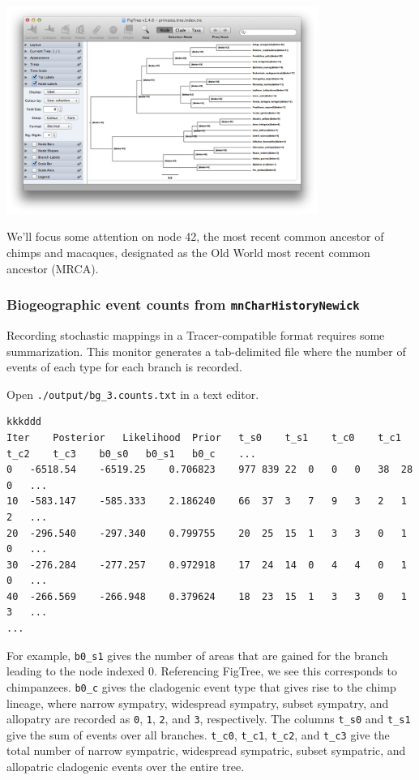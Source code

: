 \begin{centering}
\includegraphics[width=4in]{figures/figtree_node_label}
\end{centering}

We'll focus some attention on node 42, the most recent common ancestor of chimps and macaques, designated as the Old World most recent common ancestor (MRCA).

\subsubsection{Biogeographic event counts from {\tt mnCharHistoryNewick}}

Recording stochastic mappings in a Tracer-compatible format requires some summarization.
This monitor generates a tab-delimited file where the number of events of each type for each branch is recorded.

Open {\tt ./output/bg\_3.counts.txt} in a text editor.

\begin{framed}
\begin{lstlisting}[style=textboxSmall]  % \listingsfont, columns=texcl]
kkkddd
Iter	Posterior	Likelihood	Prior	t_s0	t_s1	t_c0	t_c1	t_c2	t_c3	b0_s0	b0_s1	b0_c	...
0	-6518.54	-6519.25	0.706823	977	839	22	0	0	0	38	28	0	...
10	-583.147	-585.333	2.186240	66	37	3	7	9	3	2	1	2	...
20	-296.540	-297.340	0.799755	20	25	15	1	3	3	0	1	0	...
30	-276.284	-277.257	0.972918	17	24	14	0	4	4	0	1	0	...
40	-266.569	-266.948	0.379624	18	23	15	1	3	3	0	1	3	...
...
\end{lstlisting}
\end{framed}

For example, {\tt b0\_s1} gives the number of areas that are gained for the branch leading to the node indexed 0.
Referencing FigTree, we see this corresponds to chimpanzees.
{\tt b0\_c} gives the cladogenic event type that gives rise to the chimp lineage, where narrow sympatry, widespread sympatry, subset sympatry, and allopatry are recorded as {\tt 0}, {\tt 1}, {\tt 2}, and {\tt 3}, respectively. The columns {\tt t\_s0} and {\tt t\_s1} give the sum of events over all branches. {\tt t\_c0}, {\tt t\_c1}, {\tt t\_c2}, and {\tt t\_c3} give the total number of narrow sympatric, widespread sympatric, subset sympatric, and allopatric cladogenic events over the entire tree.

